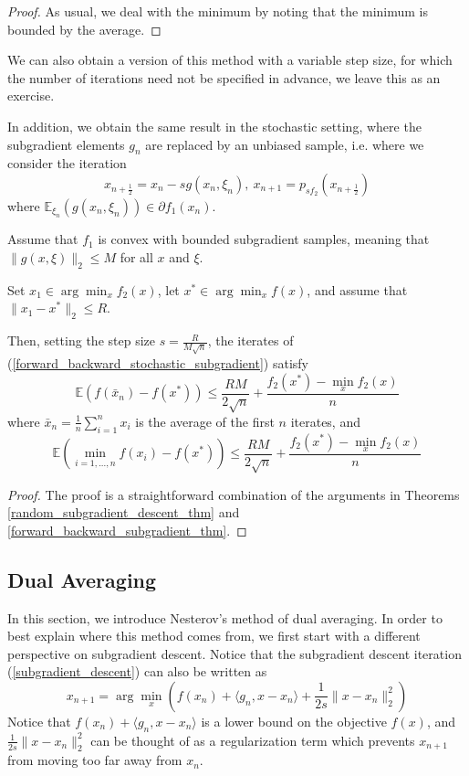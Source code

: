 \begin{proof}
 As usual, we deal with the minimum by noting that the minimum is bounded by the average.
\end{proof}

We can also obtain a version of this method with a variable step size, for which the number of iterations
need not be specified in advance, we leave this as an exercise.

In addition, we obtain the same result in the stochastic setting, where the subgradient elements $g_n$ are replaced by an unbiased 
sample, i.e. where we consider the iteration
\begin{equation}\label{forward_backward_stochastic_subgradient}
 x_{n+\frac{1}{2}} = x_n - sg(x_n,\xi_n),~x_{n+1} = p_{sf_2}(x_{n+\frac{1}{2}})
\end{equation}
where $\mathbb{E}_{\xi_n}(g(x_n,\xi_n))\in \partial f_1(x_n)$.
\begin{theorem}
 Assume that $f_1$ is convex with bounded subgradient samples, meaning that $\|g(x,\xi)\|_2 \leq M$ for all $x$ and $\xi$.
 
 Set $x_1 \in \arg\min_xf_2(x)$, let $x^*\in \arg\min_x f(x)$, and assume that $\|x_1 - x^*\|_2 \leq R$. 
 
 Then, setting the step size $s = \frac{R}{M\sqrt{n}}$,
 the iterates of (\ref{forward_backward_stochastic_subgradient}) satisfy
 \begin{equation}
  \mathbb{E}(f(\bar{x}_n) - f(x^*)) \leq \frac{RM}{2\sqrt{n}} + \frac{f_2(x^*) - \min_x f_2(x)}{n}
 \end{equation}
 where $\bar{x}_n = \frac{1}{n}\sum_{i = 1}^n x_i$ is the average of the first $n$ iterates, and
 \begin{equation}
  \mathbb{E}(\min_{i=1,...,n} f(x_i) - f(x^*)) \leq \frac{RM}{2\sqrt{n}} + \frac{f_2(x^*) - \min_x f_2(x)}{n}
 \end{equation}
\end{theorem}
\begin{proof}
  The proof is a straightforward combination of the arguments in Theorems \ref{random_subgradient_descent_thm} and
 \ref{forward_backward_subgradient_thm}.
\end{proof}

\subsection{Dual Averaging}
In this section, we introduce Nesterov's method of dual averaging. In order to best explain where this method comes from,
we first start with a different perspective on subgradient descent. Notice that the subgradient descent iteration
(\ref{subgradient_descent}) can also be written as
\begin{equation}\label{subgradient_descent_argmin}
 x_{n+1} = \arg\min_x \left(f(x_n) + \langle g_n, x - x_n\rangle + \frac{1}{2s}\|x - x_n\|_2^2\right)
\end{equation}
Notice that $f(x_n) + \langle g_n, x - x_n\rangle$ is a lower bound on the objective $f(x)$, and 
$\frac{1}{2s}\|x - x_n\|_2^2$ can be thought of as a regularization term which prevents $x_{n+1}$
from moving too far away from $x_n$.

